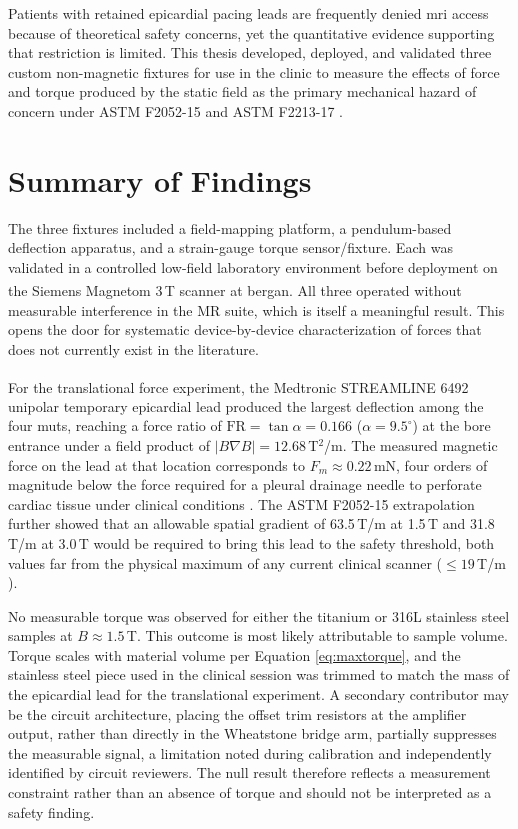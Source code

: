 Patients with retained epicardial pacing leads are frequently denied \gls{mri} access because of theoretical safety concerns, yet the quantitative evidence supporting that restriction is limited. This thesis developed, deployed, and validated three custom non-magnetic fixtures for use in the clinic to measure the effects of force and torque produced by the static field as the primary mechanical hazard of concern under ASTM F2052-15 \cite{astmF2052} and ASTM F2213-17 \cite{astm2213}.

\section{Summary of Findings}

The three fixtures included a field-mapping platform, a pendulum-based deflection apparatus, and a strain-gauge torque sensor/fixture. Each was validated in a controlled low-field laboratory environment before deployment on the Siemens Magnetom\textsuperscript\texttrademark{} 3\,T scanner at \gls{bergan}. All three operated without measurable interference in the MR suite, which is itself a meaningful result. This opens the door for systematic device-by-device  characterization of forces that does not currently exist in the literature.

For the translational force experiment, the Medtronic STREAMLINE\textsuperscript\texttrademark{} 6492 unipolar temporary epicardial lead produced the largest deflection among the four \glspl{mut}, reaching a force ratio of $\text{FR} = \tan\alpha = 0.166$ ($\alpha = 9.5^\circ$) at the bore entrance under a field product of $|B\nabla B| = 12.68$\,T$^2$/m. The measured magnetic force on the lead at that location corresponds to $F_m \approx 0.22$\,mN, four orders of magnitude below the force required for a pleural drainage needle to perforate cardiac tissue under clinical conditions \cite{guebelin2025left}. The ASTM F2052-15 extrapolation further showed that an allowable spatial gradient of 63.5\,T/m at 1.5\,T and 31.8\,T/m at 3.0\,T would be required to bring this lead to the safety threshold, both values far from the physical maximum of any current clinical scanner ($\leq 19$\,T/m \cite{astmF2052}). 

No measurable torque was observed for either the titanium or 316L stainless steel samples at $B \approx 1.5$\,T. This outcome is most likely attributable to sample volume. Torque scales with material volume per Equation \ref{eq:maxtorque}, and the stainless steel piece used in the clinical session was trimmed to match the mass of the epicardial lead for the translational experiment. A secondary contributor may be the circuit architecture, placing the offset trim resistors at the amplifier output, rather than directly in the Wheatstone bridge arm, partially suppresses the measurable signal, a limitation noted during calibration and independently identified by circuit reviewers. The null result therefore reflects a measurement constraint rather than an absence of torque and should not be interpreted as a safety finding.

